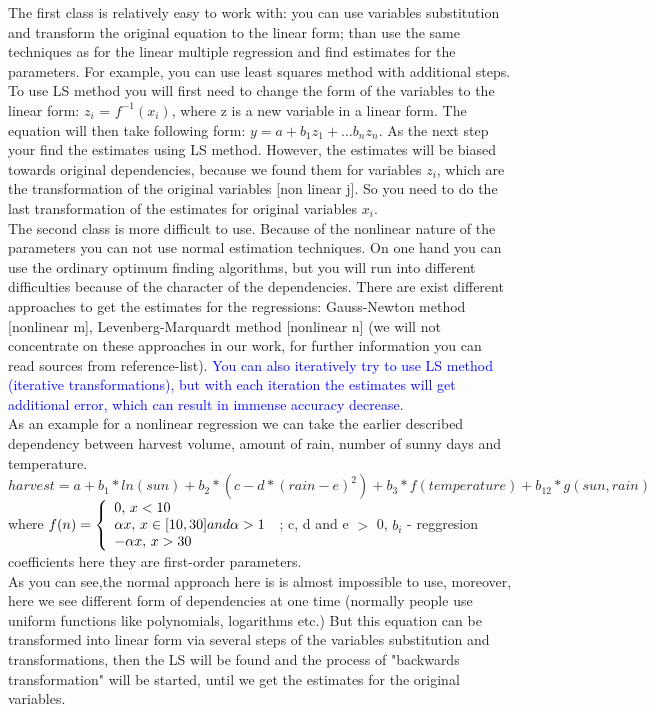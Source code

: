 \documentclass[12pt, a4paper]{article}
\begin{document}
The first class is relatively easy to work with: you can use variables substitution and transform the original equation to the linear form; than use the same techniques as for the linear multiple regression and find estimates for the parameters. For example, you can use least squares method with additional steps. To use LS method you will first need to change the form of the variables to the linear form: $z_{i}$ = $f^{-1}(x_{i})$, where z is a new variable in a linear form. The equation will then take following form: $y=a+b_{1}z_{1}+...b_{n}z_{n}$. As the next step your find the estimates using LS method. However, the estimates will be biased towards original dependencies, because we found them for variables $z_{i}$, which are the transformation of the original variables [non linear j]. So you need to do the last transformation of the estimates for original variables $x_{i}$.\\
The second class is more difficult to use. Because of the nonlinear nature of the parameters you can not use normal estimation techniques. On one hand you can use the ordinary optimum finding algorithms, but you will run into different difficulties because of the character of the dependencies. There are exist different approaches to get the estimates for the regressions: Gauss-Newton method [nonlinear m],  Levenberg-Marquardt method [nonlinear n] (we will not concentrate on these approaches in our work, for further information you can read sources from reference-list). \textcolor{blue}{You can also iteratively try to use LS method (iterative transformations), but with each iteration the estimates will get additional error, which can result in immense accuracy decrease}. \\
As an example for a nonlinear regression we can take the earlier described dependency between harvest volume, amount of rain, number of sunny days and temperature.
\[harvest = a + b_{1}*ln(sun) + b_{2}*(c-d*(rain-e)^2) +b_{3}*f(temperature) + b_{12}*g(sun, rain)\]
where $f(n) = \left\{ 
  \begin{array}{l l}
  	0,\thinspace x < 10 \\
    \alpha x, \thinspace x \in [10, 30] and \alpha > 1 \\
    -\alpha x,\thinspace x > 30
  \end{array} \right.$ ; c, d and e $>$ 0, $b_{i}$ - reggresion coefficients here they are first-order parameters. \\
As you can see,the normal approach here is is almost impossible to use, moreover, here we see different form of dependencies at one time (normally people use uniform functions like polynomials, logarithms etc.) But this equation can be transformed into linear form via several steps of the variables substitution and transformations, then the LS will be found and the process of "backwards transformation" will be started, until we get the estimates for the original variables.
\end{document}
